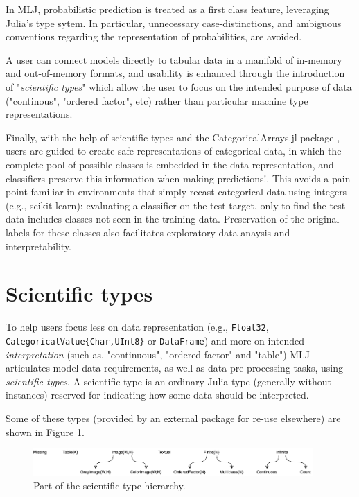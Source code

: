 \documentclass{article}
\begin{document}
In MLJ, probabilistic prediction is treated as a first class feature,
leveraging Julia's type sytem. In particular, unnecessary
case-distinctions, and ambiguous conventions regarding the
representation of probabilities, are avoided.

A user can connect models directly to tabular data in a manifold of
in-memory and out-of-memory formats, and usability is enhanced through
the introduction of "\textit{scientific types}" which allow the user
to focus on the intended purpose of data ("continous", "ordered
factor", etc) rather than particular machine type representations.

Finally, with the help of scientific types and the
CategoricalArrays.jl package \cite{CategoricalArrays}, users are
guided to create safe representations of categorical data, in which
the complete pool of possible classes is embedded in the data
representation, and classifiers preserve this information when making
predictions!. This avoids a pain-point familiar in environments that
simply recast categorical data using integers (e.g., scikit-learn):
evaluating a classifier on the test target, only to find the test data
includes classes not seen in the training data. Preservation of the
original labels for these classes also facilitates exploratory data
anaysis and interpretability.

\section{Scientific types}

To help users focus less on data representation (e.g.,
\texttt{Float32}, \texttt{CategoricalValue\{Char,UInt8\}} or
\texttt{DataFrame}) and more on intended \textit{interpretation} (such
as, "continuous", "ordered factor" and "table") MLJ articulates model
data requirements, as well as data pre-processing tasks, using
\textit{scientific types}. A scientific type is an ordinary Julia type
(generally without instances) reserved for indicating how some data
should be interpreted.

Some of these types (provided by an external package for re-use elsewhere) are shown in Figure \ref{fig:fig1}.

\begin{figure}
  \centering
  \includegraphics[width=0.95\textwidth]{scitypesII}
  \caption{Part of the scientific type hierarchy.}
  \label{fig:fig1}
\end{figure}
\end{document}
